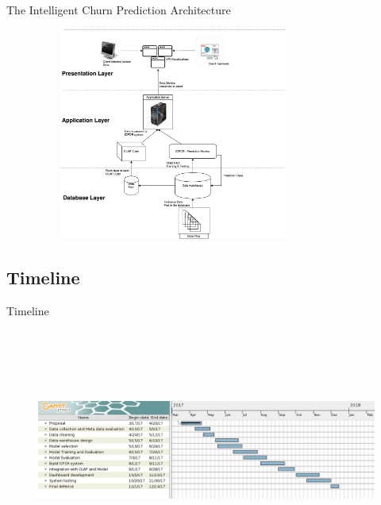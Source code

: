 \documentclass{beamer}
\begin{document}
\begin{frame}{The Intelligent Churn Prediction Architecture}
	\begin{figure}[h]
		\includegraphics[width=9cm,height=7cm]{figures/ICPCR_pic1SystemDesign}
		\centering
	\end{figure}
\end{frame}

\subsection{Timeline}
\begin{frame}{Timeline}
\begin{figure}
	\includegraphics[width=13cm, height=8cm]{figures/churngantt3.png} 
  \end{figure}
\end{frame}
\end{document}
